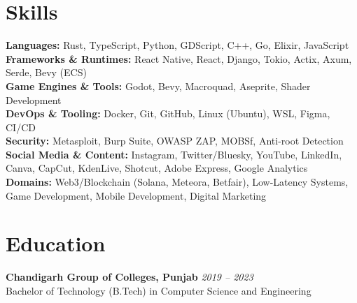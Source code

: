 \documentclass[11pt,letterpaper]{article}
\newcommand{\subsecitem}[4]{
  {\textbf{#1}} \hfill {\small\textit{#2}}\\
  {\small\color{accent}#3} \hfill {\small\textit{#4}}\\
  \vspace{-2pt}
}
\begin{document}
\section{Skills}

\begin{flushleft}
\small
\textbf{Languages:} \hspace{2pt} Rust, TypeScript, Python, GDScript, C++, Go, Elixir, JavaScript \\
\vspace{1pt}
\textbf{Frameworks \& Runtimes:} \hspace{2pt} React Native, React, Django, Tokio, Actix, Axum, Serde, Bevy (ECS) \\
\vspace{1pt}
\textbf{Game Engines \& Tools:} \hspace{2pt} Godot, Bevy, Macroquad, Aseprite, Shader Development \\
\vspace{1pt}
\textbf{DevOps \& Tooling:} \hspace{2pt} Docker, Git, GitHub, Linux (Ubuntu), WSL, Figma, CI/CD \\
\vspace{1pt}
\textbf{Security:} \hspace{2pt} Metasploit, Burp Suite, OWASP ZAP, MOBSf, Anti-root Detection \\
\vspace{1pt}
\textbf{Social Media \& Content:} \hspace{2pt} Instagram, Twitter/Bluesky, YouTube, LinkedIn, Canva, CapCut, KdenLive, Shotcut, Adobe Express, Google Analytics \\
\vspace{1pt}
\textbf{Domains:} \hspace{2pt} Web3/Blockchain (Solana, Meteora, Betfair), Low-Latency Systems, Game Development, Mobile Development, Digital Marketing
\end{flushleft}

\section{Education}

\subsecitem{Chandigarh Group of Colleges, Punjab}{2019 -- 2023}
          {Bachelor of Technology (B.Tech) in Computer Science and Engineering}
          {}
\end{document}

